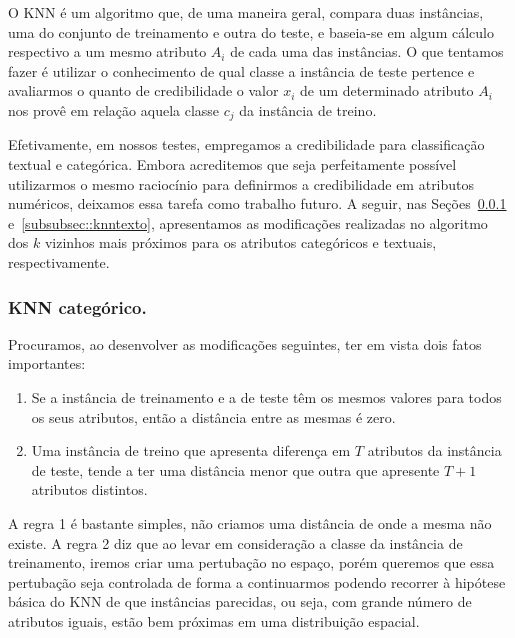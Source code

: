 O \textsc{KNN} é um algoritmo que, de uma maneira geral, compara duas instâncias, uma do conjunto de treinamento e outra do teste, e baseia-se em algum cálculo respectivo a um mesmo atributo $A_i$ de cada uma das instâncias. O que tentamos fazer é utilizar o conhecimento de qual classe a instância de teste pertence e avaliarmos o quanto de credibilidade o valor $x_i$ de um determinado atributo $A_i$ nos provê em relação aquela classe $c_j$ da instância de treino.

Efetivamente, em nossos testes, empregamos a credibilidade para classificação textual e categórica. Embora acreditemos que seja perfeitamente possível utilizarmos o mesmo raciocínio para definirmos a credibilidade em atributos numéricos, deixamos essa tarefa como trabalho futuro. A seguir, nas Seções~\ref{subsubsec::knncat} e~\ref{subsubsec::knntexto}, apresentamos as modificações realizadas no algoritmo dos $k$ vizinhos mais próximos para os atributos categóricos e textuais, respectivamente.

\subsubsection{\textsc{KNN} categórico.}
\label{subsubsec::knncat}

Procuramos, ao desenvolver as modificações seguintes, ter em vista dois fatos importantes:
\begin{enumerate}
\item Se a instância de treinamento e a de teste têm os mesmos valores para todos os seus atributos, então a distância entre as mesmas é zero. 
\item Uma instância de treino que apresenta diferença em $T$ atributos da instância de teste, tende a ter uma distância menor que outra que apresente $T+1$ atributos distintos.
\end{enumerate}

A regra 1 é bastante simples, não criamos uma distância de onde a mesma não existe. A regra 2 diz que ao levar em consideração a classe da instância de treinamento, iremos criar uma pertubação no espaço, porém queremos que essa pertubação seja controlada de forma a continuarmos podendo recorrer à hipótese básica do \textsc{KNN} de que instâncias parecidas, ou seja, com grande número de atributos iguais, estão bem próximas em uma distribuição espacial.

